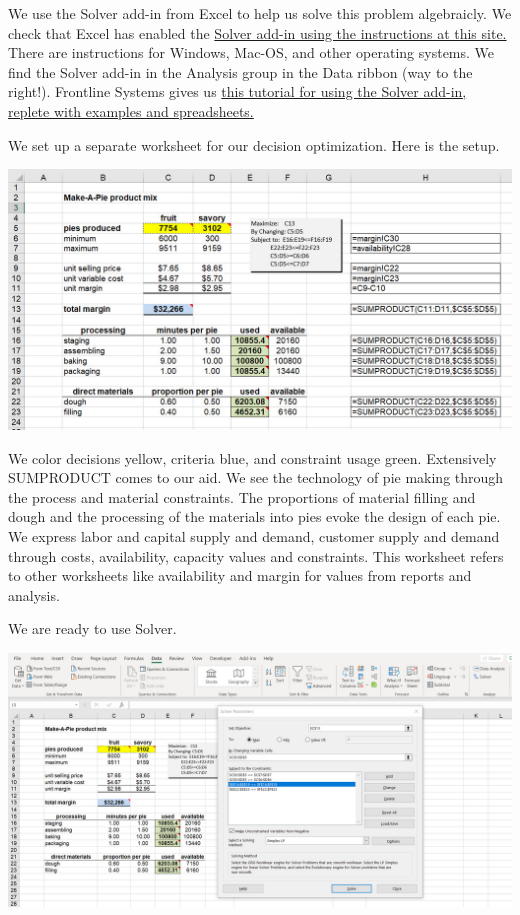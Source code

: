 \documentclass[
]{book}
\begin{document}
We use the Solver add-in from Excel to help us solve this problem algebraicly. We check that Excel has enabled the \href{https://support.microsoft.com/en-us/office/load-the-solver-add-in-in-excel-612926fc-d53b-46b4-872c-e24772f078ca\#:~:text=Load\%20the\%20Solver\%20Add-in\%20in\%20Excel.\%201\%20In,the\%20Analysis\%20group\%20on\%20the\%20Data\%20tab.\%20}{Solver add-in using the instructions at this site.} There are instructions for Windows, Mac-OS, and other operating systems. We find the Solver add-in in the Analysis group in the Data ribbon (way to the right!). Frontline Systems gives us \href{https://www.solver.com/tutorials}{this tutorial for using the Solver add-in, replete with examples and spreadsheets.}

We set up a separate worksheet for our decision optimization. Here is the setup.

\includegraphics{images/03/pie-2-product-solver-sheet.jpg}

We color decisions yellow, criteria blue, and constraint usage green. Extensively SUMPRODUCT comes to our aid. We see the technology of pie making through the process and material constraints. The proportions of material filling and dough and the processing of the materials into pies evoke the design of each pie. We express labor and capital supply and demand, customer supply and demand through costs, availability, capacity values and constraints. This worksheet refers to other worksheets like availability and margin for values from reports and analysis.

We are ready to use Solver.

\includegraphics{images/03/pie-2-product-solver-1.jpg}
\end{document}
